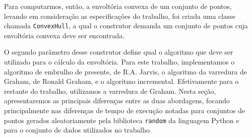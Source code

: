 \documentclass{article}
\begin{document}
Para computarmos, então, a envoltória convexa de um conjunto de pontos, levando em consideração as especificações do trabalho, foi criada uma classe chamada \texttt{ConvexHull}, a qual o construtor demanda um conjunto de pontos cuja envoltória convexa deve ser encontrada.

O segundo parâmetro desse construtor define qual o algoritmo que deve ser utilizado para o cálculo da envoltória. Para este trabalho, implementamos o algoritmo de embrulho de presente, de R.A. Jarvis, o algoritmo da varredura de Graham, de Ronald Graham, e o algoritmo incremental. Efetivamente para o restante do trabalho, utilizamos a varredura de Graham. Nesta seção, apresentaremos as principais diferenças entre as duas abordagens, focando principalmente nas diferenças de tempo de execução notadas para conjuntos de pontos gerados aleatoriamente pela biblioteca \texttt{random} da linguagem Python e para o conjunto de dados utilizados no trabalho.
\end{document}
